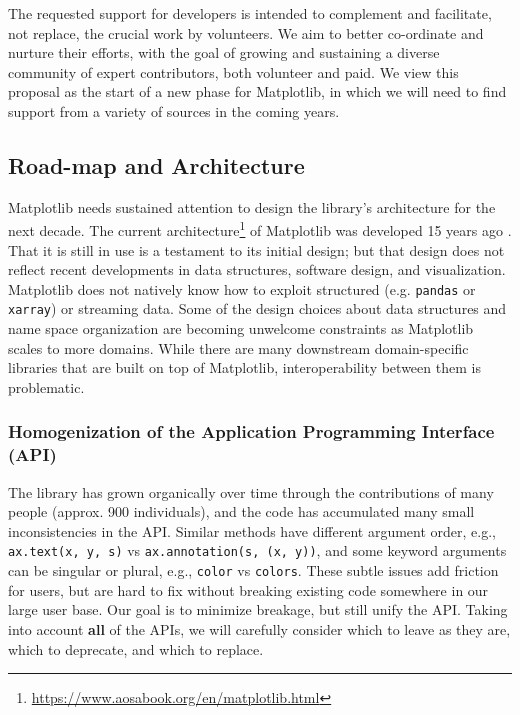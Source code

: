 \documentclass[11pt,letterpaper]{article}  %
\begin{document}
The requested support for developers is intended to complement and
facilitate, not replace, the crucial work by volunteers.  We aim to
better co-ordinate and nurture their
efforts, with the goal of growing and sustaining a diverse community
of expert contributors, both volunteer and paid.  We view
this proposal as the start of a new phase for Matplotlib, in which we
will need to find support from a variety of sources in the coming years.



\subsection{Road-map and Architecture}

Matplotlib needs sustained attention to design the library's
architecture for the next decade.  The current
architecture\footnote{\url{https://www.aosabook.org/en/matplotlib.html}} of
Matplotlib was developed 15 years ago \cite{Hunter:2007}.  That it is
still in use is a testament to its initial design; but that design
does not reflect recent developments in data structures, software
design, and visualization.  Matplotlib does not natively know how to
exploit structured (e.g. \texttt{pandas} or \texttt{xarray}) or
streaming data.  Some of the design choices about data structures and
name space organization are
becoming unwelcome constraints as Matplotlib scales to more domains.  While
there are many downstream domain-specific libraries that are built on
top of Matplotlib, interoperability between them is problematic.


\subsubsection{Homogenization of the Application Programming Interface (API)}
\label{sec:api_hom}
The library has grown organically over time through the contributions
of many people (approx. 900 individuals), and the code has accumulated
many small inconsistencies in the API.  Similar methods have different
argument order, e.g., \texttt{ax.text(x, y, s)} vs
\texttt{ax.annotation(s, (x, y))}, and some keyword arguments can be
singular or plural, e.g., \texttt{color} vs \texttt{colors}.  These
subtle issues add friction for users, but are hard to fix without
breaking existing code somewhere in our large user base.  Our goal is
to minimize breakage, but still unify the API.  Taking into account
\textbf{all} of the APIs, we will carefully consider which to leave as
they are, which to deprecate, and which to replace.
\end{document}
